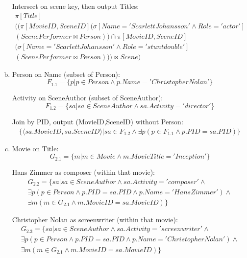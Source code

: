 \documentclass{article}
\begin{document}
\begin{enumerate}[(a)]
Intersect on scene key, then output Titles:
\begin{multline}
\pi\left[Title\right]\\
 ((\pi\left[MovieID,SceneID\right](\sigma\left[Name='Scarlett Johansson' \land Role='actor'\right]\\
 (ScenePerformer \Join Person)) \cap \pi\left[MovieID,SceneID\right]\\
 (\sigma\left[Name='Scarlett Johansson' \land Role='stunt double'\right]\\
 (ScenePerformer \Join Person))) \Join Scene)
\end{multline}

\item
Person on Name (subset of Person):
\begin{equation}
F_{1.1} = \{p | p \in Person \land p.Name='Christopher Nolan' \}
\end{equation}

Activity on SceneAuthor (subset of SceneAuthor):
\begin{equation}
F_{1.2} = \{sa | sa \in SceneAuthor \land sa.Activity='director' \}
\end{equation}

Join by PID, output (MovieID,SceneID) without Person:
\begin{multline}
\{\langle sa.MovieID, sa.SceneID \rangle | sa \in F_{1.2} \land \exists p(p \in F_{1.1} \land p.PID = sa.PID)\}
\end{multline}

\item
Movie on Title:
\begin{equation}
G_{2.1} = \{m | m \in Movie \land m.MovieTitle='Inception'\}
\end{equation}

Hans Zimmer as composer (within that movie):
\begin{multline}
G_{2.2} = \{sa | sa \in SceneAuthor \land sa.Activity='composer' \land \\
\exists p(p \in Person \land p.PID=sa.PID \land p.Name='Hans Zimmer') \land \\
\exists m(m \in G_{2.1} \land m.MovieID=sa.MovieID)\}
\end{multline}

Christopher Nolan as screenwriter (within that movie):
\begin{multline}
G_{2.3} = \{sa | sa \in SceneAuthor \land sa.Activity='screenwriter' \land \\
\exists p(p \in Person \land p.PID=sa.PID \land p.Name='Christopher Nolan') \land \\
\exists m(m \in G_{2.1} \land m.MovieID=sa.MovieID)\}
\end{multline}


\end{enumerate}
\end{document}
